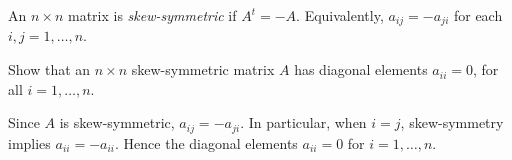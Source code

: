 \documentclass{ximera}
\begin{document}
\begin{definition} \rm \label{D:skew_symmetric} 
An $n\times n$ matrix is {\em skew-symmetric} if $A^t = -A$. Equivalently, $a_{ij} = -a_{ji}$ for each $i,j = 1,\ldots,n$.
\end{definition}


\begin{exercise} \label{YZ_1.3_skewsym1}
Show that an $n\times n$ skew-symmetric matrix $A$ has diagonal elements $a_{ii}=0$, for all $i=1,\ldots,n$.

\begin{solution}
\soln Since $A$ is skew-symmetric, $a_{ij} = -a_{ji}$. In particular, when $i = j$, skew-symmetry implies $a_{ii} = -a_{ii}$. Hence the diagonal elements $a_{ii} = 0$ for $i=1,\ldots, n$.
\end{solution}
\end{exercise}
\end{document}
